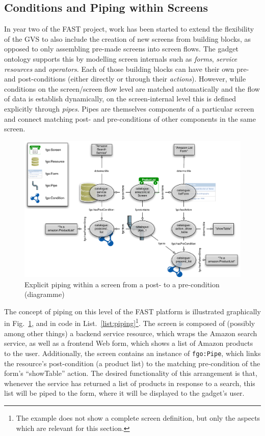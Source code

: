 \documentclass{article}
\begin{document}
\subsection{Conditions and Piping within Screens} %
\label{sub:piping_within_screens}

In year two of the FAST project, work has been started to extend the flexibility of the GVS to also include the creation of new screens from building blocks, as opposed to only assembling pre-made screens into screen flows. The gadget ontology supports this by modelling screen internals such as \emph{forms}, \emph{service resources} and \emph{operators}. Each of those building blocks can have their own pre- and post-conditions (either directly or through their \emph{actions}). However, while conditions on the screen/screen flow level are matched automatically and the flow of data is establish dynamically, on the screen-internal level this is defined explicitly through \emph{pipes}. Pipes are themselves components of a particular screen and connect matching post- and pre-conditions of other components in the same screen. 

\begin{figure}
  \begin{center}
    \includegraphics[width=\linewidth]{images/declarativeDefinitionExample.pdf}
    \caption{Explicit piping within a screen from a post- to a pre-condition (diagramme)}
    \label{fig:piping}
  \end{center}
\end{figure}

The concept of piping on this level of the FAST platform is illustrated graphically in Fig.~\ref{fig:piping}, and in code in List.~\ref{list:piping}\footnote{The example does not show a complete screen definition, but only the aspects which are relevant for this section.}. The screen is composed of (possibly among other things) a backend service resource, which wraps the Amazon search service, as well as a frontend Web form, which shows a list of Amazon products to the user. Additionally, the screen contains an instance of \texttt{fgo:Pipe}, which links the resource's post-condition (a product list) to the matching pre-condition of the form's ``showTable'' action. The desired functionality of this arrangement is that, whenever the service has returned a list of products in response to a search, this list will be piped to the form, where it will be displayed to the gadget's user.
\end{document}
